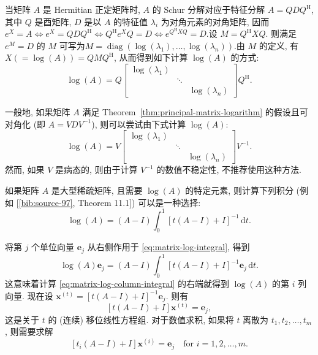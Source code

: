 {当矩阵 $A$ 是 Hermitian 正定矩阵时, $A$ 的 Schur 分解对应于特征分解 $A=QDQ^{\mathrm H}$, 其中 $Q$ 是酉矩阵, $D$ 是以 $A$ 的特征值 $\lambda_i$ 为对角元素的对角矩阵, 因而\newline{}$e^X=A\Leftrightarrow e^X=QDQ^{\mathrm H}\Leftrightarrow Q^{\mathrm H}e^XQ=D\Leftrightarrow e^{Q^{\mathrm H}XQ}=D$.\newline{}设 $M=Q^{\mathrm H}XQ$. 则满足 $e^M=D$ 的 $M$ 可写为\newline{}$M=\operatorname{diag}(\log(\lambda_1),\ldots,\log(\lambda_n))$.\newline{}由 $M$ 的定义, 有 $X(=\log(A))=QMQ^{\mathrm H}$, 从而得到如下计算 $\log(A)$ 的方式:}
\[\log(A)=Q\begin{bmatrix}\log(\lambda_1)&&\\&\ddots&\\&&\log(\lambda_n)\end{bmatrix}Q^{\mathrm H}.\]

{一般地, 如果矩阵 $A$ 满足 Theorem~\ref{thm:principal-matrix-logarithm} 的假设且可对角化 (即 $A=VDV^{-1}$), 则可以尝试由下式计算 $\log(A)$:}
\[\log(A)=V\begin{bmatrix}\log(\lambda_1)&&\\&\ddots&\\&&\log(\lambda_n)\end{bmatrix}V^{-1}.\]
{然而, 如果 $V$ 是病态的, 则由于计算 $V^{-1}$ 的数值不稳定性, 不推荐使用这种方法.}

{如果矩阵 $A$ 是大型稀疏矩阵, 且需要 $\log(A)$ 的特定元素, 则计算下列积分 (例如 [\hyperref[bib:source-97]{\ref*{bib:source-97}}, Theorem 11.1]) 可以是一种选择:}
\begin{equation}\label{eq:matrix-log-integral}\log(A)=(A-I)\int_0^1[t(A-I)+I]^{-1}\,\mathrm{d}t.\end{equation}

{将第 $j$ 个单位向量 $\boldsymbol{e}_j$ 从右侧作用于 \eqref{eq:matrix-log-integral}, 得到}
\begin{equation}\label{eq:matrix-log-column-integral}\log(A)\boldsymbol{e}_j=(A-I)\int_0^1[t(A-I)+I]^{-1}\boldsymbol{e}_j\,\mathrm{d}t.\end{equation}
{这意味着计算 \eqref{eq:matrix-log-column-integral} 的右端就得到 $\log(A)$ 的第 $i$ 列向量. 现在设 $\boldsymbol{x}^{(t)}=[t(A-I)+I]^{-1}\boldsymbol{e}_j$. 则有}
\[[t(A-I)+I]\boldsymbol{x}^{(t)}=\boldsymbol{e}_j,\]
{这是关于 $t$ 的 (连续) 移位线性方程组. 对于数值求积, 如果将 $t$ 离散为 $t_1,t_2,\ldots,t_m$, 则需要求解}
\begin{equation}\label{eq:matrix-log-quadrature-systems}[t_i(A-I)+I]\boldsymbol{x}^{(i)}=\boldsymbol{e}_j\quad\text{for }i=1,2,\ldots,m.\end{equation}

